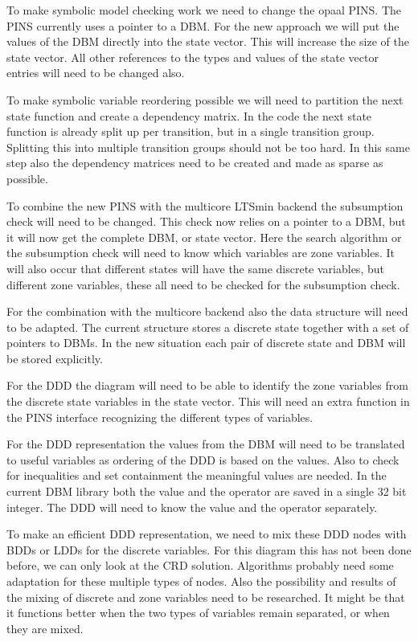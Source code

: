 \documentclass[11pt]{article}
\begin{document}
To make symbolic model checking work we need to change the opaal PINS. The PINS currently uses a pointer to a DBM. For the new approach we will put the values of the DBM directly into the state vector. This will increase the size of the state vector. All other references to the types and values of the state vector entries will need to be changed also. 

To make symbolic variable reordering possible we will need to partition the next state function and create a dependency matrix. In the code the next state function is already split up per transition, but in a single transition group. Splitting this into multiple transition groups should not be too hard. In this same step also the dependency matrices need to be created and made as sparse as possible.

To combine the new PINS with the multicore LTSmin backend the subsumption check will need to be changed. This check now relies on a pointer to a DBM, but it will now get the complete DBM, or state vector. Here the search algorithm or the subsumption check will need to know which variables are zone variables. It will also occur that different states will have the same discrete variables, but different zone variables, these all need to be checked for the subsumption check.

For the combination with the multicore backend also the data structure will need to be adapted. The current structure stores a discrete state together with a set of pointers to DBMs. In the new situation each pair of discrete state and DBM will be stored explicitly.

For the DDD the diagram will need to be able to identify the zone variables from the discrete state variables in the state vector. This will need an extra function in the PINS interface recognizing the different types of variables.  

For the DDD representation the values from the DBM will need to be translated to useful variables as ordering of the DDD is based on the values. Also to check for inequalities and set containment the meaningful values are needed. In the current DBM library both the value and the operator are saved in a single 32 bit integer. The DDD will need to know the value and the operator separately.

To make an efficient DDD representation, we need to mix these DDD nodes with BDDs or LDDs for the discrete variables. For this diagram this has not been done before, we can only look at the CRD solution. Algorithms probably need some adaptation for these multiple types of nodes. Also the possibility and results of the mixing of discrete and zone variables need to be researched. It might be that it functions better when the two types of variables remain separated, or when they are mixed.
\end{document}
